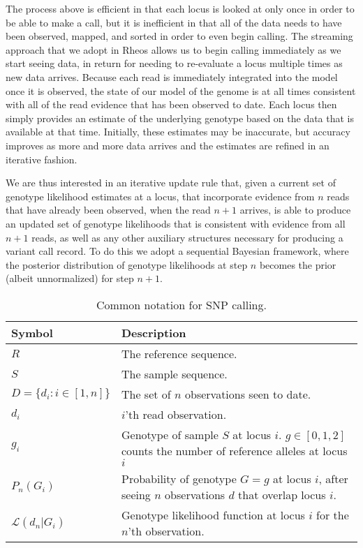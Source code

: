 The process above is efficient in that each locus is looked at only once in order to be able to make a call, but it is inefficient in that all of the data needs to have been observed, mapped, and sorted in order to even begin calling. The streaming approach that we adopt in Rheos allows us to begin calling immediately as we start seeing data, in return for needing to re-evaluate a locus multiple times as new data arrives. Because each read is immediately integrated into the model once it is observed, the state of our model of the genome is at all times consistent with all of the read evidence that has been observed to date. Each locus then simply provides an estimate of the underlying genotype based on the data that is available at that time. Initially, these estimates may be inaccurate, but accuracy improves as more and more data arrives and the estimates are refined in an iterative fashion.   

We are thus interested in an iterative update rule that, given a current set of genotype likelihood estimates at a locus, that incorporate evidence from $n$ reads that have already been observed, when the read $n+1$ arrives, is able to produce an updated set of genotype likelihoods that is consistent with evidence from all $n+1$ reads, as well as any other auxiliary structures necessary for producing a variant call record. To do this we adopt a sequential Bayesian framework, where the posterior distribution of genotype likelihoods at step $n$ becomes the prior (albeit unnormalized) for step $n+1$. 

\begin{table}[!h]
    \caption {Common notation for SNP calling.}
    \label{tab:snp_calling_notation}
    {\begin{tabular}{lp{9.5cm}}
    \toprule
    Symbol & Description \\
    \midrule
    $R$ & The reference sequence. \\
    $S$ & The sample sequence. \\
    $D = \{d_i: i \in [1,n]\}$ & The set of $n$ observations seen to date. \\ 
    $d_i$ & $i$'th read observation. \\
    $g_{i}$ & Genotype of sample $S$ at locus $i$. $g \in [0,1,2]$ counts the number of reference alleles at locus $i$\\
    $P_n(G_i)$ & Probability of genotype $G = g$ at locus $i$, after seeing $n$ observations $d$ that overlap locus $i$.\\
    $\mathcal{L}(d_n|G_i)$ & Genotype likelihood function at locus $i$ for the $n$'th observation.\\
    \bottomrule
    \end{tabular}}
\end{table}

